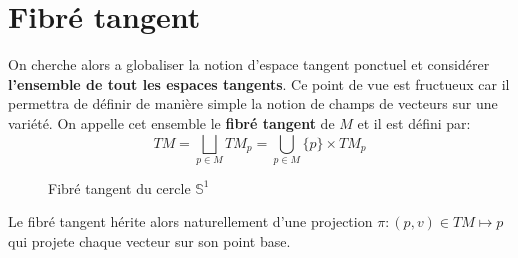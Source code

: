    \section{Fibré tangent}
   On cherche alors a globaliser la notion d'espace tangent ponctuel et considérer \textbf{l'ensemble de tout les espaces tangents}. Ce point de vue est fructueux car il permettra de définir de manière simple la notion de champs de vecteurs sur une variété. On appelle cet ensemble le \textbf{fibré tangent} de \( M \) et il est défini par:
   \[ 
      TM = \bigsqcup_{p \in M} TM_p = \bigcup_{p \in M} \{p\} \times TM_p
   \]
   \begin{figure}[h]
      \centering
      \caption{Fibré tangent du cercle \( \mathbb{S}^1 \)}
   \end{figure}

   Le fibré tangent hérite alors naturellement d'une projection \( \pi : (p, v) \in TM \mapsto p\) qui projete chaque vecteur sur son point base.
   \pagebreak
